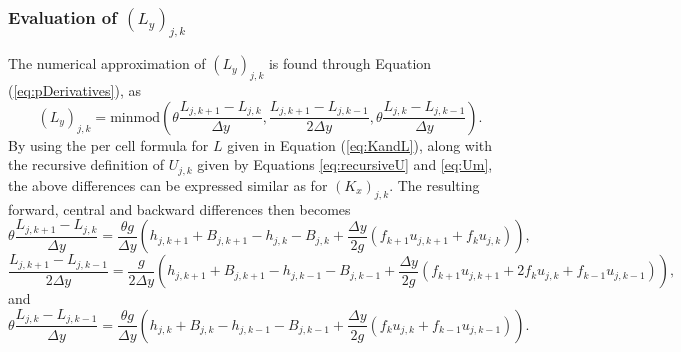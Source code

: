 \documentclass[11pt, a4paper]{article}
\newcommand{\dy}[0]{\Delta y}
\newcommand{\eref}[1]{Equation (\ref{eq:#1})}
\begin{document}
\subsubsection{Evaluation of $(L_y)_{j,k}$}
The numerical approximation of $(L_y)_{j,k}$ is found through \eref{pDerivatives}, as
\begin{equation}
	(L_y)_{j,k} = \mathrm{minmod} \left( \theta \frac{L_{j,k+1} - L_{j,k}}{\dy}, \frac{L_{j,k+1} - L_{j,k-1}}{2\dy}, \theta \frac{L_{j,k} - L_{j,k-1}}{\dy}\right).
	\label{eq:LDerivative}
\end{equation}
By using the per cell formula for $L$ given in \eref{KandL}, along with the recursive definition of $U_{j,k}$ given by Equations \eqref{eq:recursiveU} and \eqref{eq:Um}, the above differences can be expressed similar as for $(K_x)_{j,k}$.
The resulting forward, central and backward differences then becomes
\begin{equation}
	\theta \frac{L_{j,k+1} - L_{j,k}}{\dy} = \frac{\theta g}{\dy} \left(h_{j,k+1} + B_{j,k+1} - h_{j,k} - B_{j,k} + \frac{\dy}{2g} \left(f_{k+1}u_{j,k+1} + f_{k}u_{j,k}   \right)  \right),
	\label{eq:Lforward}
\end{equation}
\begin{equation}
	\frac{L_{j,k+1} - L_{j,k-1}}{2\dy} = \frac{g}{2\dy} \left(h_{j,k+1} + B_{j,k+1} - h_{j,k-1} - B_{j,k-1} + \frac{\dy}{2g} \left(f_{k+1}u_{j,k+1} + 2f_{k}u_{j,k} + f_{k-1}u_{j,k-1}   \right)  \right),
	\label{eq:Lcentral}
\end{equation}
and
\begin{equation}
	\theta \frac{L_{j,k} - L_{j,k-1}}{\dy} = \frac{\theta g}{\dy} \left(h_{j,k} + B_{j,k} - h_{j,k-1} - B_{j,k-1} + \frac{\dy}{2g} \left(f_{k}u_{j,k} + f_{k-1}u_{j,k-1}   \right)  \right).
	\label{eq:Lbackward}
\end{equation}
\end{document}
